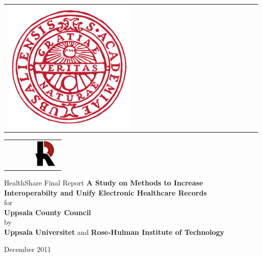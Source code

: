 
\begin{titlepage}

\begin{minipage}{4cm}
\begin{tabular}{l}
\includegraphics[width=0.5\textwidth]{Images/uppsala}
\end{tabular}
\end{minipage}
\hfill
\begin{minipage}{4cm}
\begin{tabular}{r}
\includegraphics[width=0.5\textwidth]{Images/logo}
\end{tabular}
\end{minipage}


\begin{center}

\textmd{HealthShare Final Report}
\vfill
 \huge{\textbf{A Study on Methods to Increase Interoperabilty and Unify Electronic Healthcare Records } }\\[2.0cm]
for\\
\large\textbf{Uppsala County Council}\\[1.0cm]
by\\
\large{\textbf{Uppsala Universitet}} and \large{\textbf{Rose-Hulman Institute of Technology}}\\[1.0cm]

\end{center}

\begin{center}
\vfill
December 2011\\
\end{center}

\end{titlepage}